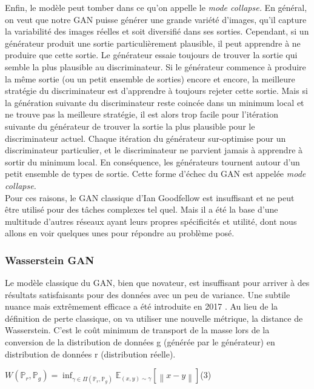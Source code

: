 \documentclass[12pt, oneside, a4paper, titlepage]{article}
\begin{document}
Enfin, le modèle peut tomber dans ce qu'on appelle le \textit{mode collapse.} En général, on veut que notre GAN puisse générer une grande variété d'images, qu'il capture la variabilité des images réelles et soit diversifié dans ses sorties. Cependant, si un générateur produit une sortie particulièrement plausible, il peut apprendre à ne produire que cette sortie. Le générateur essaie toujours de trouver la sortie qui semble la plus plausible au discriminateur. Si le générateur commence à produire la même sortie (ou un petit ensemble de sorties) encore et encore, la meilleure stratégie du discriminateur est d'apprendre à toujours rejeter cette sortie. Mais si la génération suivante du discriminateur reste coincée dans un minimum local et ne trouve pas la meilleure stratégie, il est alors trop facile pour l'itération suivante du générateur de trouver la sortie la plus plausible pour le discriminateur actuel. Chaque itération du générateur sur-optimise pour un discriminateur particulier, et le discriminateur ne parvient jamais à apprendre à sortir du minimum local. En conséquence, les générateurs tournent autour d'un petit ensemble de types de sortie. Cette forme d'échec du GAN est appelée \textit{mode collapse.} \\

Pour ces raisons, le GAN classique d'Ian Goodfellow est insuffisant et ne peut être utilisé pour des tâches complexes tel quel. Mais il a été la base d'une multitude d'autres réseaux ayant leurs propres spécificités et utilité, dont nous allons en voir quelques unes pour répondre au problème posé.

\subsubsection{Wasserstein GAN}

Le modèle classique du GAN, bien que novateur, est insuffisant pour arriver à des résultats satisfaisants pour des données avec un peu de variance. Une subtile nuance mais extrêmement efficace a été introduite en 2017 \cite{arjovsky_wasserstein_2017}. 
Au lieu de la définition de perte classique, on va utiliser une nouvelle métrique, la distance de Wasserstein. C'est le coût minimum de transport de la masse lors de la conversion de la distribution de données g (générée par le générateur) en distribution de données r (distribution réelle). \vspace{5mm} 

\centerline{\(W(\mathbb{P}_{r},\mathbb{P}_{g}) = \inf_{\gamma\in\Pi(\mathbb{P}_{r},\mathbb{P}_{g})}\mathbb{E}_{(x,y)\sim \gamma }[\left \| x-y \right \|] \)(3)} \\
\end{document}
